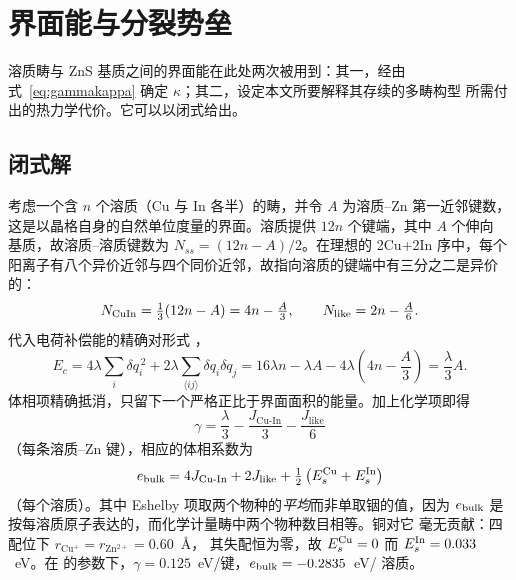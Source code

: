 \documentclass[11pt,a4paper]{ctexart}
\newcommand{\JCuIn}{J_{\mathrm{Cu\text{-}In}}}
\newcommand{\Jlike}{J_{\mathrm{like}}}
\begin{document}
\section{界面能与分裂势垒}
\label{sec:gamma}

溶质畴与 ZnS 基质之间的界面能在此处两次被用到：其一，经由
式~\eqref{eq:gammakappa} 确定 $\kappa$；其二，设定本文所要解释其存续的多畴构型
所需付出的热力学代价。它可以以闭式给出。

\subsection{闭式解}
\label{sec:gammaclosed}

考虑一个含 $n$ 个溶质（Cu 与 In 各半）的畴，并令 $A$ 为溶质--Zn 第一近邻键数，
这是以晶格自身的自然单位度量的界面。溶质提供 $12n$ 个键端，其中 $A$ 个伸向
基质，故溶质--溶质键数为 $N_{ss} = (12n - A)/2$。在理想的 2Cu+2In 序中，每个
阳离子有八个异价近邻与四个同价近邻，故指向溶质的键端中有三分之二是异价的：
\begin{equation}
N_{\rm CuIn} = \tfrac{1}{3}(12n - A) = 4n - \tfrac{A}{3},
\qquad
N_{\rm like} = 2n - \tfrac{A}{6}.
\label{eq:bondcounts}
\end{equation}
代入电荷补偿能的精确对形式 \citep{yu2026}，
\begin{equation}
E_c = 4\lambda \sum_i \delta q_i^{\,2}
    + 2\lambda \sum_{\langle ij \rangle} \delta q_i \delta q_j
    = 16\lambda n - \lambda A - 4\lambda\left(4n - \frac{A}{3}\right)
    = \frac{\lambda}{3} A .
\label{eq:Ecgamma}
\end{equation}
体相项精确抵消，只留下一个严格正比于界面面积的能量。加上化学项即得
\begin{equation}
\boxed{\;
\gamma = \frac{\lambda}{3} - \frac{\JCuIn}{3} - \frac{\Jlike}{6}
\;}
\label{eq:gamma}
\end{equation}
（每条溶质--Zn 键），相应的体相系数为
\begin{equation}
e_{\rm bulk} = 4\JCuIn + 2\Jlike
             + \tfrac{1}{2}\left(E_s^{\rm Cu} + E_s^{\rm In}\right)
\label{eq:ebulk}
\end{equation}
（每个溶质）。其中 Eshelby 项取两个物种的\emph{平均}而非单取铟的值，因为
$e_{\rm bulk}$ 是按每溶质原子表达的，而化学计量畴中两个物种数目相等。铜对它
毫无贡献：四配位下 $r_{\mathrm{Cu^+}} = r_{\mathrm{Zn^{2+}}} = 0.60$~\AA{}，
其失配恒为零，故 $E_s^{\rm Cu} = 0$ 而 $E_s^{\rm In} = 0.033$~eV。在
\citet{yu2026} 的参数下，$\gamma = 0.125$~eV/键，$e_{\rm bulk} = -0.2835$~eV/
溶质。
\end{document}
